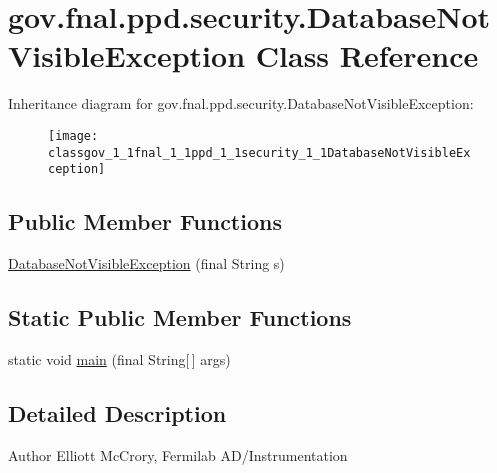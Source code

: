 \hypertarget{classgov_1_1fnal_1_1ppd_1_1security_1_1DatabaseNotVisibleException}{\section{gov.\-fnal.\-ppd.\-security.\-Database\-Not\-Visible\-Exception Class Reference}
\label{classgov_1_1fnal_1_1ppd_1_1security_1_1DatabaseNotVisibleException}
}
Inheritance diagram for gov.\-fnal.\-ppd.\-security.\-Database\-Not\-Visible\-Exception\-:\begin{figure}[H]
\begin{center}
\leavevmode
\texttt{[image: classgov\_1\_1fnal\_1\_1ppd\_1\_1security\_1\_1DatabaseNotVisibleException]}
\end{center}
\end{figure}
\subsection*{Public Member Functions}
\begin{DoxyCompactItemize}
\item 
\hyperlink{classgov_1_1fnal_1_1ppd_1_1security_1_1DatabaseNotVisibleException_a32f650c9cc95fb8fe0951d92a68c8069}{Database\-Not\-Visible\-Exception} (final String s)
\end{DoxyCompactItemize}
\subsection*{Static Public Member Functions}
\begin{DoxyCompactItemize}
\item 
static void \hyperlink{classgov_1_1fnal_1_1ppd_1_1security_1_1DatabaseNotVisibleException_a82075ee14623f4d7eca9f622a8551e2f}{main} (final String\mbox{[}$\,$\mbox{]} args)
\end{DoxyCompactItemize}


\subsection{Detailed Description}
\begin{DoxyAuthor}{Author}
Elliott Mc\-Crory, Fermilab A\-D/\-Instrumentation 
\end{DoxyAuthor}


